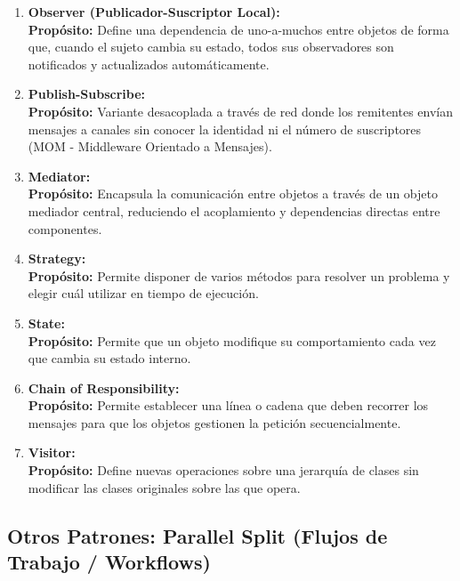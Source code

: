 \begin{enumerate}[leftmargin=1.5em]
  \item \textbf{Observer (Publicador-Suscriptor Local):}\\
  \textbf{Propósito:} Define una dependencia de uno-a-muchos entre objetos de forma que, cuando el sujeto cambia su estado, todos sus observadores son notificados y actualizados automáticamente.

  \item \textbf{Publish-Subscribe:}\\
  \textbf{Propósito:} Variante desacoplada a través de red donde los remitentes envían mensajes a canales sin conocer la identidad ni el número de suscriptores (MOM - Middleware Orientado a Mensajes).

  \item \textbf{Mediator:}\\
  \textbf{Propósito:} Encapsula la comunicación entre objetos a través de un objeto mediador central, reduciendo el acoplamiento y dependencias directas entre componentes.

  \item \textbf{Strategy:}\\
  \textbf{Propósito:} Permite disponer de varios métodos para resolver un problema y elegir cuál utilizar en tiempo de ejecución.

  \item \textbf{State:}\\
  \textbf{Propósito:} Permite que un objeto modifique su comportamiento cada vez que cambia su estado interno.

  \item \textbf{Chain of Responsibility:}\\
  \textbf{Propósito:} Permite establecer una línea o cadena que deben recorrer los mensajes para que los objetos gestionen la petición secuencialmente.

  \item \textbf{Visitor:}\\
  \textbf{Propósito:} Define nuevas operaciones sobre una jerarquía de clases sin modificar las clases originales sobre las que opera.
\end{enumerate}

\subsection{Otros Patrones: Parallel Split (Flujos de Trabajo / Workflows)}

